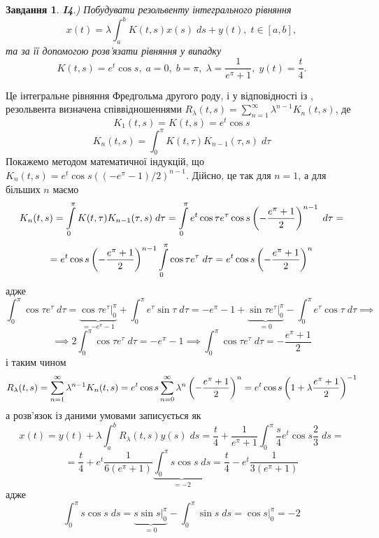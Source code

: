 \documentclass[12pt]{article} %
\newtheorem{prob}{Завдання}
\newcommand{\ds}{\;ds}
\newcommand{\dta}{\;d\tau}
\begin{document}
\begin{prob}{\bf I4}.{)} Побудувати резольвенту інтегрального рівняння
	\[x(t)=\lambda\int_a^bK(t,s)x(s)\ds+y(t),\;t\in[a,b],\]
	та за її допомогою розв’язати рівняння у випадку
	\[K(t,s)=e^t\cos s,\;a=0,\;b=\pi,\;\lambda=\frac{1}{e^\pi+1},\;y(t)=\frac{t}{4}.\]
\end{prob}
Це інтегральне рівняння Фредгольма другого роду, і у відповідності із \cite[с. 37]{kukush},
резольвента визначена співвідношеннями $R_{\lambda}(t,s)=\sum_{n=1}^\infty\lambda^{n-1}K_n(t,s)$, де
\[K_1(t,s)=K(t,s)=e^t\cos s\]
\[K_n(t,s)=\int_0^\pi K(t,\tau)K_{n-1}(\tau,s)\dta\]
Покажемо методом математичної індукцій, що $K_n(t,s)=e^t\cos s((-e^\pi-1)/2)^{n-1}$. Дійсно, це так для $n=1$, а для більших $n$ маємо
\[K_n(t,s)=\int_0^\pi K(t,\tau)K_{n-1}(\tau,s)\dta=\int_0^\pi e^t\cos\tau e^\tau\cos s\mybra{-\frac{e^\pi+1}{2}}^{n-1}\dta=\]
\[=e^t\cos s\mybra{-\frac{e^\pi+1}{2}}^{n-1}\int_0^\pi \cos\tau e^\tau\dta=e^t\cos s\mybra{-\frac{e^\pi+1}{2}}^n\]
адже
\[\int_0^\pi \cos\tau e^\tau\dta
={\underbrace{\cos\tau e^\tau\bigg|_0^\pi}_{=-e^\pi-1}+\int_0^\pi e^\tau\sin\tau\dta}=
{-e^\pi-1+\underbrace{\sin\tau e^\tau\bigg|_0^\pi}_{=0}-\int_0^\pi e^\tau\cos\tau\dta}\implies\]
\[\implies 2\int_0^\pi \cos\tau e^\tau\dta=-e^\pi-1\implies\int_0^\pi \cos\tau e^\tau\dta=-\frac{e^\pi+1}{2}\]
і таким чином
\[R_{\lambda}(t,s)=\sum_{n=1}^\infty\lambda^{n-1}K_n(t,s)=e^t\cos s\sum_{n=0}^\infty\lambda^n\mybra{-\frac{e^\pi+1}{2}}^n=e^t\cos s
\mybra{1+\lambda\frac{e^\pi+1}{2}}^{-1}\]
а розв’язок із даними умовами записується як
\[x(t)=y(t)+\lambda\int_a^bR_{\lambda}(t,s)y(s)\ds=\frac{t}{4}+\frac{1}{e^\pi+1}\int_0^\pi \frac{s}{4}e^t\cos s \frac{2}{3}\ds=\]
\[=\frac{t}{4}+e^t\frac{1}{6(e^\pi+1)}\underbrace{\int_0^\pi s\cos s\ds}_{=-2}=
\frac{t}{4}-e^t\frac{1}{3(e^\pi+1)}\]
адже
\[\int_0^\pi s\cos s\ds=\underbrace{s\sin s\bigg|_0^\pi}_{=0}-\int_0^\pi\sin s\ds=\cos s\bigg|_0^\pi=-2\]
\end{document}
